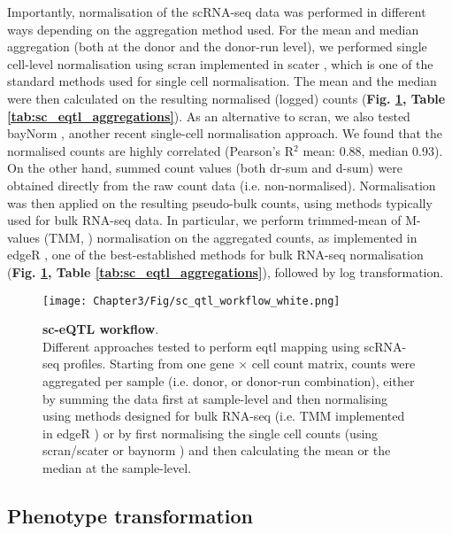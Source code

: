 Importantly, normalisation of the scRNA-seq data was performed in different ways depending on the aggregation method used. 
For the mean and median aggregation (both at the donor and the donor-run level), we performed single cell-level normalisation using scran \cite{lun2016pooling} implemented in scater \cite{mccarthy2017scater}, which is one of the standard methods used for single cell normalisation. 
The mean and the median were then calculated on the resulting normalised (logged) counts (\textbf{Fig. \ref{fig:sc_qtl_workflow}, Table \ref{tab:sc_eqtl_aggregations}}). 
As an alternative to scran, we also tested bayNorm \cite{tang2020baynorm}, another recent single-cell normalisation approach. 
We found that the normalised counts are highly correlated (Pearson's R$^2$ mean: 0.88, median 0.93). 
On the other hand, summed count values (both dr-sum and d-sum) were obtained directly from the raw count data (i.e. non-normalised). 
Normalisation was then applied on the resulting pseudo-bulk counts, using methods typically used for bulk RNA-seq data.
In particular, we perform trimmed-mean of M-values (TMM, \cite{robinson2010scaling}) normalisation on the aggregated counts, as implemented in edgeR \cite{robinson2010edger}, one of the best-established methods for bulk RNA-seq normalisation (\textbf{Fig. \ref{fig:sc_qtl_workflow}, Table \ref{tab:sc_eqtl_aggregations}}), followed by log transformation.

\begin{figure}[h]
\centering
\texttt{[image: Chapter3/Fig/sc\_qtl\_workflow\_white.png]}
\caption[sc-eQTL workflow]{\textbf{sc-eQTL workflow}.\\
Different approaches tested to perform \gls{eqtl} mapping using scRNA-seq profiles.
Starting from one gene $\times$ cell count matrix, counts were aggregated per sample (i.e. donor, or donor-run combination), either by summing the data first at sample-level and then normalising using methods designed for bulk RNA-seq (i.e. TMM implemented in edgeR \cite{robinson2010scaling, robinson2010edger}) or by first normalising the single cell counts (using scran/scater \cite{lun2016pooling, mccarthy2017scater} or baynorm \cite{tang2020baynorm}) and then calculating the mean or the median at the sample-level. }
\label{fig:sc_qtl_workflow}
\end{figure}

\subsection{Phenotype transformation}

